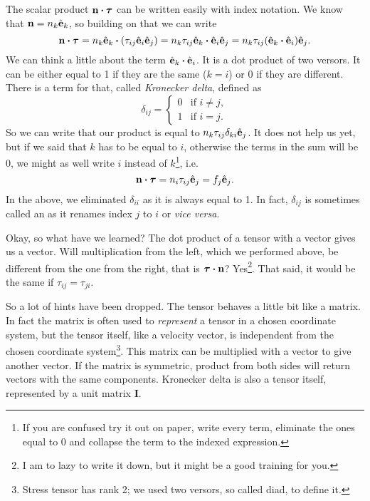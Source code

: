 \documentclass[a4paper]{article}
\begin{document}
The scalar product \(\vb{n}\dotproduct\bm{\tau}\) can be written easily 
with index notation. We know that \(\vb{n} = n_k \hat{\vb{e}}_k\), so 
building on that we can write
\[
  \vb{n}\dotproduct\bm{\tau} 
  = n_k \hat{\vb{e}}_k \dotproduct \qty(\tau_{ij}\hat{\vb{e}}_i \hat{\vb{e}}_j)
  = n_k \tau_{ij} \hat{\vb{e}}_k \dotproduct \hat{\vb{e}}_i \hat{\vb{e}}_j 
  = n_k \tau_{ij} \qty(\hat{\vb{e}}_k \dotproduct \hat{\vb{e}}_i) \hat{\vb{e}}_j.
\]
We can think a little about the term \(\hat{\vb{e}}_k \dotproduct \hat{\vb{e}}_i\).
It is a dot product of two versors. It can be either equal to 1 if they are 
the same (\(k=i\)) or 0 if they are different. There is a term for that, called
\emph{Kronecker delta}, defined as
\[
  \delta_{ij} = \begin{cases}
0 &\text{if } i \neq j,   \\
1 &\text{if } i=j.   \end{cases}
\]
So we can write that our product is equal to 
\(n_k \tau_{ij}\delta_{ki} \hat{\vb{e}}_j \). It does not help us yet, but if 
we said that \(k\) has to be equal to \(i\), otherwise the terms in the sum 
will be 0, we might as well write \(i\) instead of \(k\)\footnote{If you are 
confused try it out on paper, write every term, eliminate the ones equal to 0
and collapse the term to the indexed expression.}, i.e.\
\[
  \vb{n}\dotproduct\bm{\tau} = n_i \tau_{ij} \hat{\vb{e}}_j = f_j \hat{\vb{e}}_j.
\]
In the above, we eliminated \(\delta_{ii}\) as it is always equal to 1. In fact,
\(\delta_{ij}\) is sometimes called an \say{index renamer} as it renames index 
\(j\) to \(i\) or \textit{vice versa}.

Okay, so what have we learned? The dot product of a tensor with a vector gives 
us a vector. Will multiplication from the left, which we performed above, be 
different from the one from the right, that is \(\bm{\tau}\dotproduct\vb{n}\)?
Yes\footnote{I am to lazy to write it down, but it might be a good training
for you.}. That said, it would be the same if \(\tau_{ij} = \tau_{ji}\).

So a lot of hints have been dropped. The tensor behaves a little bit like a 
matrix. In fact the matrix is often used to \emph{represent} a tensor in a 
chosen coordinate system, but the tensor itself, like a velocity vector, is 
independent from the chosen coordinate system\footnote{Stress tensor has rank 2; we 
used two versors, so called diad, to define it.}. This matrix can be multiplied with a vector to give 
another vector. If the matrix is symmetric, product from both sides will return vectors 
with the same components. Kronecker delta is also a tensor itself, represented by
a unit matrix \(\bm{I}\).
\end{document}
